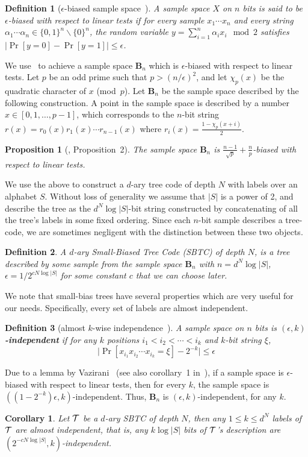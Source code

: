 \documentclass[ letterpaper, 11pt]{article}
\newtheorem{definition}{Definition}
\newtheorem{proposition}[theorem]{Proposition}
\newtheorem{corollary}[theorem]{Corollary}
\newcommand{\KTC}{\textsf{SBTC}\xspace}
\begin{document}
\begin{definition}[$\epsilon$-biased sample space~\cite{NN90, AGHP92}]
A sample space $X$ on $n$ bits is said to be $\epsilon$-biased with respect to linear tests
if for every sample $x_1\dotsm x_n$ and every string $\alpha_1\dotsm\alpha_n \in \{0,1\}^n\smallsetminus\{0\}^n$, the random variable $y=\sum_{i=1}^n \alpha_ix_i \mod 2$ satisfies
$|\Pr[y=0]-\Pr[y=1]| \le \epsilon$.
\end{definition}
We use~\cite[Construction 2]{AGHP92} to achieve a sample space $\mathbf B_n$
which is $\epsilon$-biased with respect to linear tests.
Let $p$ be an odd prime such that $p>(n/\epsilon)^2$,
and let $\chi_p(x)$ be the quadratic character of {$x$ (mod~$p$)}.
Let $\mathbf B_n$ be the sample space described by the following construction.
A point in the sample space is described by a number $x\in [0,1,\ldots, p-1]$,
which corresponds to the $n$-bit string $r(x)=r_0(x)r_1(x)\dotsm r_{n-1}(x)$
where $r_i(x) = \frac{1-\chi_p(x+i)}{2}$.
\begin{proposition}[\cite{AGHP92}, Proposition~2]
The sample space $\mathbf B_n$ is $\frac{n-1}{\sqrt p}+\frac{n}{p}$-biased with respect to linear tests.
\end{proposition}
We use the above to construct
a $d$-ary tree code of depth $N$ with labels over an alphabet $S$.
Without loss of generality we assume that $|S|$ is a power of 2, and
describe the tree as the $d^N\log|S|$-bit string constructed by concatenating of all
the tree's labels in some fixed ordering.
Since each $n$-bit sample describes a tree-code,
we are sometimes negligent with the distinction between these two objects.

\begin{definition}\label{def:SBTC}
A $d$-ary \emph{Small-Biased Tree Code} (\KTC) of depth $N$, is a tree described by some sample
from the sample space $\mathbf B_n$ with $n=d^N\log |S|$, $\epsilon = 1/2^{cN\log |S|}$ for some constant $c$ that we can choose later.
\end{definition}


We note that small-bias trees have several properties which are very useful for our needs.
Specifically, every set of labels are almost independent.
\begin{definition}[almost $k$-wise independence~\cite{AGHP92}]\label{def:independent}
A sample space on $n$ bits is \textbf{$(\epsilon,k)$-independent} if for any
$k$ positions $i_1 < i_2 < \dotsm < i_k$ and $k$-bit string $\xi$,
\[
\lvert \Pr[ x_{i_1}x_{i_2}\dotsm x_{i_k} = \xi] - 2^{-k}\rvert \le \epsilon
\]
\end{definition}
Due to a lemma by Vazirani~\cite{Vazirani86} (see also corollary~1 in~\cite{AGHP92}),
if a sample space is $\epsilon$-biased with respect to linear tests, then for every $k$, the sample space is $((1-2^{-k})\epsilon, k)$-independent. Thus, $\mathbf B_n$ is $(\epsilon,k)$-independent, for any $k$.
\begin{corollary}\label{cor:k-independence}
Let ${\cal T}$ be a $d$-ary \KTC of depth $N$, then any $1\le k\le d^N$ labels of ${\cal T}$ are almost independent,
that is, any $k\log|S|$ bits of ${\cal T}$'s description
are $(2^{-cN\log|S|},k)$-independent.
\end{corollary}
\end{document}
